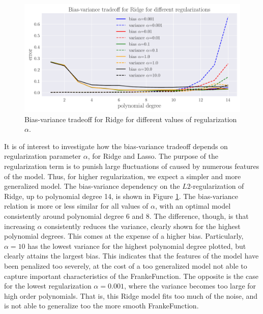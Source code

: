 \documentclass[a4paper]{article}
\begin{document}
	\begin{figure}[h]
		\centering
		\includegraphics[scale=0.5]{../output_extra/plots/bias_var_Ridge_c14_alpha.pdf}
		\caption{Bias-variance tradeoff for Ridge for different values of regularization $\alpha$.}
		\label{fig:Ridge_alpha}
	\end{figure}
	
	It is of interest to investigate how the bias-variance tradeoff depends on regularization parameter $\alpha$, for Ridge and Lasso. The purpose of the regularization term is to punish large fluctuations of caused by numerous features of the model. Thus, for higher regularization, we expect a simpler and more generalized model. The bias-variance dependency on the $L2$-regularization of Ridge, up to polynomial degree 14, is shown in Figure \ref{fig:Ridge_alpha}. The bias-variance relation is more or less similar for all values of $\alpha$, with an optimal model consistently around polynomial degree 6 and 8. The difference, though, is that increasing $\alpha$ consistently reduces the variance, clearly shown for the highest polynomial degrees. This comes at the expense of a higher bias. Particularly, $\alpha=10$ has the lowest variance for the highest polynomial degree plotted, but clearly attains the largest bias. This indicates that the features of the model have been penalized too severely, at the cost of a too generalized model not able to capture important characteristics of the FrankeFunction. The opposite is the case for the lowest regularization $\alpha=0.001$, where the variance becomes too large for high order polynomials. That is, this Ridge model fits too much of the noise, and is not able to generalize too the more smooth FrankeFunction.
	
\end{document}
